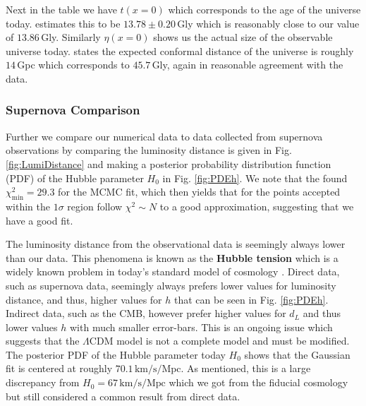 \documentclass[%
reprint,
 amsmath,amssymb,
 aps,
]{revtex4-2}
\begin{document}
Next in the table we have $t(x=0)$ which corresponds to the age of the universe today. \cite{Planck:2018vyg} estimates this to be $13.78\pm0.20\,$Gly which is reasonably close to our value of $13.86\,$Gly. Similarly $\eta(x=0)$ shows us the actual size of the observable universe today. \cite{Gott:2003pf} states the expected conformal distance of the universe is roughly $14\,$Gpc which corresponds to $45.7\,$Gly, again in reasonable agreement with the data. 
\subsubsection{Supernova Comparison}
Further we compare our numerical data to data collected from supernova observations \cite{SDSS:2014iwm} by comparing the luminosity distance is given in Fig. \ref{fig:LumiDistance} and making a posterior probability distribution function (PDF) of the Hubble parameter $H_0$ in Fig. \ref{fig:PDEh}. We note that the found $\chi^2_\text{min}=29.3$ for the MCMC fit, which then yields that for the points accepted within the $1\sigma$ region follow $\chi^2\sim N$ to a good approximation, suggesting that we have a good fit. 

The luminosity distance from the observational data is seemingly always lower than our data. This phenomena is known as the \textbf{Hubble tension} which is a widely known problem in today's standard model of cosmology \cite{Di_Valentino_2021}. Direct data, such as supernova data, seemingly always prefers lower values for luminosity distance, and thus, higher values for $h$ that can be seen in Fig. \ref{fig:PDEh}. Indirect data, such as the CMB, however prefer higher values for $d_L$ and thus lower values $h$ with much smaller error-bars. This is an ongoing issue which suggests that the $\Lambda$CDM model is not a complete model and must be modified. The posterior PDF of the Hubble parameter today $H_0$ shows that the Gaussian fit is centered at roughly $70.1\,\text{km/s/Mpc}$. As mentioned, this is a large discrepancy from $H_0=67\,\text{km/s/Mpc}$ which we got from the fiducial cosmology but still considered a common result from direct data. 
\end{document}
